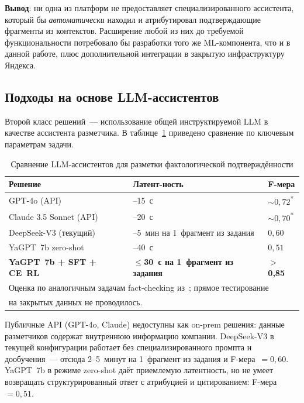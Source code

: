 \documentclass[times]{itmo-student-thesis}
\begin{document}
\textbf{Вывод}: ни одна из платформ не предоставляет специализированного
ассистента, который бы \emph{автоматически} находил и атрибутировал
подтверждающие фрагменты из контекстов. Расширение любой из них до
требуемой функциональности потребовало бы разработки того же
ML-компонента, что и в данной работе, плюс дополнительной интеграции
в закрытую инфраструктуру Яндекса.

\subsection{Подходы на основе LLM-ассистентов}

Второй класс решений~--- использование общей инструктируемой LLM
в качестве ассистента разметчика. В таблице~\ref{tab:llm-comparison}
приведено сравнение по ключевым параметрам задачи.

\begin{table}[h]
\caption{Сравнение LLM-ассистентов для разметки фактологической подтверждённости}\label{tab:llm-comparison}
\centering
\small
\begin{tabularx}{\textwidth}{|l|>{\centering}X|>{\centering\arraybackslash}X|}
\hline
\textbf{Решение} & \textbf{Латент-ность} & \textbf{F-мера} \\
\hline
GPT-4o (API) & 5–15~с & $\sim0{,}72$\textsuperscript{*} \\
\hline
Claude 3.5 Sonnet (API) & 8–20~с & $\sim0{,}70$\textsuperscript{*} \\
\hline
DeepSeek-V3 (текущий) & 2–5~мин на 1~фрагмент из задания & $0{,}60$ \\
\hline
YaGPT~7b zero-shot & 20–40~с & $0{,}51$ \\
\hline
\textbf{YaGPT~7b + SFT + CE~RL} & \textbf{$\le$30~с на 1~фрагмент из задания} & \textbf{$>$0{,}85} \\
\hline
\multicolumn{3}{l}{\footnotesize * Оценка по аналогичным задачам fact-checking из~\cite{silicon-annotation, llm-eval-survey}; прямое тестирование} \\
\multicolumn{3}{l}{\footnotesize на закрытых данных не проводилось.} \\
\end{tabularx}
\end{table}

Публичные API (GPT-4o, Claude) недоступны как on-prem решения: данные
разметчиков содержат внутреннюю информацию компании. DeepSeek-V3 в
текущей конфигурации работает без специализированного промпта и
дообучения~--- отсюда 2–5~минут на 1~фрагмент из задания и F-мера~$= 0{,}60$.
YaGPT~7b в режиме zero-shot даёт приемлемую латентность, но не умеет
возвращать структурированный ответ с атрибуцией и цитированием:
F-мера~$= 0{,}51$.
\end{document}
